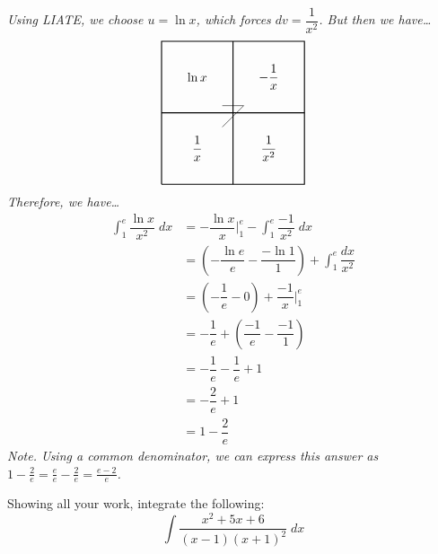 \documentclass[12pt,letterpaper]{exam}
\newcommand{\boxseven}[4]{%
	\draw[thick] (0,0) -- (4,0) -- (4,4) -- (0,4) -- (0,0);
	\draw[thick] (0,2) -- (4,2);
	\draw[thick] (2,0) -- (2,4);
	\draw (1.7,2.2) -- (2.3,2.2) -- (1.7,1.6);
	\node at (1,3) {$#1$};	%
	\node at (3,1) {$#2$};	%
	\node at (1,1) {$#3$};	%
	\node at (3,3) {$#4$};	%
}
\begin{document}
\begin{questions}
{\itshape \tsol Using LIATE, we choose $u= \ln x$, which forces $dv= \dfrac{1}{x^2}$. But then we have\dots
	\[
	\begin{tikzpicture}
	\boxseven{\ln x}{\dfrac{1}{x^2}}{\dfrac{1}{x}}{-\dfrac{1}{x}}
	\end{tikzpicture}
	\]
Therefore, we have\dots
	\[
	\begin{aligned}
	\int_1^e \dfrac{\ln x}{x^2} \;dx&= -\dfrac{\ln x}{x} \bigg|_1^e - \int_1^e \dfrac{-1}{x^2} \;dx \\[0.3cm]
	&= \left( -\dfrac{\ln e}{e} - \dfrac{-\ln 1}{1} \right) + \int_1^e \dfrac{dx}{x^2} \\[0.3cm]
	&= \left(-\dfrac{1}{e} - 0 \right) + \dfrac{-1}{x} \bigg|_1^e \\[0.3cm]
	&= -\dfrac{1}{e} + \left( \dfrac{-1}{e} - \dfrac{-1}{1} \right) \\[0.3cm]
	&= -\dfrac{1}{e} - \dfrac{1}{e} + 1 \\[0.3cm]
	&= -\dfrac{2}{e} + 1 \\[0.3cm]
	&= 1 - \dfrac{2}{e}
	\end{aligned}
	\]
\vfill
{\tiny Note. Using a common denominator, we can express this answer as $1 - \frac{2}{e}= \frac{e}{e} - \frac{2}{e}= \frac{e - 2}{e}$.}
}



\newpage
\question[10] Showing all your work, integrate the following:
	\[
	\int \dfrac{x^2 + 5x + 6}{(x - 1)(x + 1)^2} \;dx
	\] \pspace


\end{questions}
\end{document}
